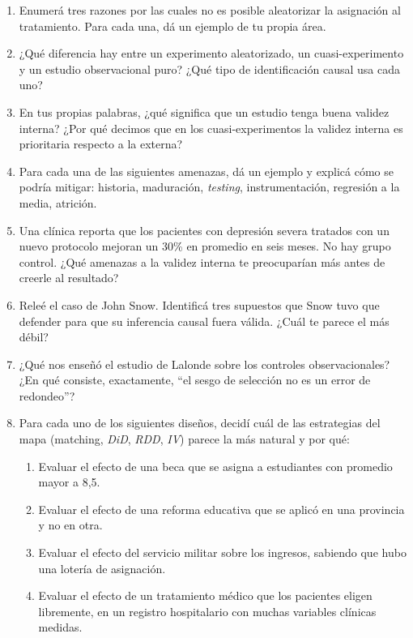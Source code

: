 \documentclass[
  letterpaper,
  DIV=11,
  numbers=noendperiod,
  oneside]{scrreprt}
\providecommand{\tightlist}{%
  \setlength{\itemsep}{0pt}\setlength{\parskip}{0pt}}\usepackage{longtable,booktabs,array}
\begin{document}
\begin{enumerate}
\def\labelenumi{\arabic{enumi}.}
\item
  Enumerá tres razones por las cuales no es posible aleatorizar la
  asignación al tratamiento. Para cada una, dá un ejemplo de tu propia
  área.
\item
  ¿Qué diferencia hay entre un experimento aleatorizado, un
  cuasi-experimento y un estudio observacional puro? ¿Qué tipo de
  identificación causal usa cada uno?
\item
  En tus propias palabras, ¿qué significa que un estudio tenga buena
  validez interna? ¿Por qué decimos que en los cuasi-experimentos la
  validez interna es prioritaria respecto a la externa?
\item
  Para cada una de las siguientes amenazas, dá un ejemplo y explicá cómo
  se podría mitigar: historia, maduración, \emph{testing},
  instrumentación, regresión a la media, atrición.
\item
  Una clínica reporta que los pacientes con depresión severa tratados
  con un nuevo protocolo mejoran un 30\% en promedio en seis meses. No
  hay grupo control. ¿Qué amenazas a la validez interna te preocuparían
  más antes de creerle al resultado?
\item
  Releé el caso de John Snow. Identificá tres supuestos que Snow tuvo
  que defender para que su inferencia causal fuera válida. ¿Cuál te
  parece el más débil?
\item
  ¿Qué nos enseñó el estudio de Lalonde sobre los controles
  observacionales? ¿En qué consiste, exactamente, ``el sesgo de
  selección no es un error de redondeo''?
\item
  Para cada uno de los siguientes diseños, decidí cuál de las
  estrategias del mapa (matching, \emph{DiD}, \emph{RDD}, \emph{IV})
  parece la más natural y por qué:

  \begin{enumerate}
  \def\labelenumii{\alph{enumii}.}
  \tightlist
  \item
    Evaluar el efecto de una beca que se asigna a estudiantes con
    promedio mayor a 8,5.
  \item
    Evaluar el efecto de una reforma educativa que se aplicó en una
    provincia y no en otra.
  \item
    Evaluar el efecto del servicio militar sobre los ingresos, sabiendo
    que hubo una lotería de asignación.
  \item
    Evaluar el efecto de un tratamiento médico que los pacientes eligen
    libremente, en un registro hospitalario con muchas variables
    clínicas medidas.
  \end{enumerate}
\end{enumerate}
\end{document}
